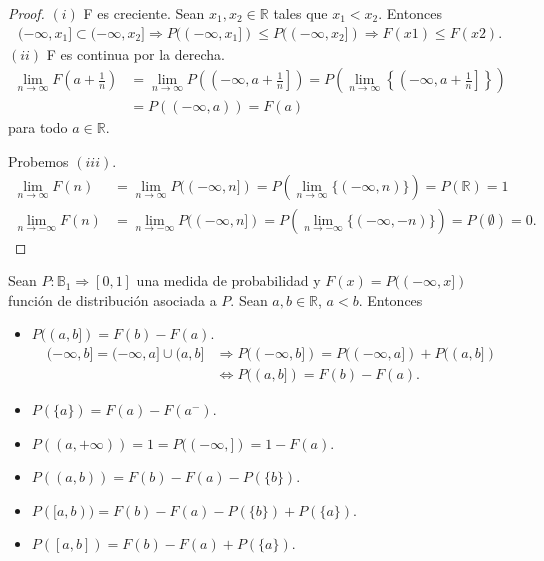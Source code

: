 \begin{proof}
    $(i)$ F es creciente. Sean $x_1, x_2 \in \mathbb{R}$ tales que $x_1 < x_2$. Entonces
    \begin{align*}
        (-\infty, x_1] \subset (-\infty, x_2] \Longrightarrow P((-\infty, x_1]) \leq P((-\infty, x_2]) \Longrightarrow F(x1) \leq F(x2).
    \end{align*}
    $(ii)$ F es continua por la derecha.
    \begin{align*}
        \lim_{n \to \infty}{F\left( a + \frac{1}{n}\right)} & = \lim_{n \to \infty}{P\left(\left( -\infty, a + \frac{1}{n}\right]\right)} = P\left( \lim_{n \to \infty}{\left\{ \left( -\infty, a + \frac{1}{n} \right]\right\}} \right) \\
                                                            & = P((-\infty, a)) = F(a)
    \end{align*}
    para todo $a \in \mathbb{R}$.

    Probemos $(iii)$.
    \begin{align*}
        \lim_{n \to \infty}{F(n)}  & = \lim_{n \to \infty}{P((-\infty, n])} = P\left(\lim_{n \to \infty}{\{(-\infty, n) \}}\right) =P(\mathbb{R}) = 1             \\
        \lim_{n \to -\infty}{F(n)} & = \lim_{n \to -\infty}{P((-\infty, n])} = P\left(\lim_{n \to -\infty}{\{(-\infty, -n) \}}\right) =P(\mathbb{\emptyset}) = 0.
    \end{align*}
\end{proof}

\begin{obs}
    Sean $P: \mathbb{B}_1 \Longrightarrow [0,1]$ una medida de probabilidad y $F(x) = P((-\infty,x])$ función de distribución asociada a $P$. Sean $a, b \in \mathbb{R}$, $a < b$. Entonces
    \begin{itemize}
        \item $P((a,b]) = F(b) - F(a)$.
              \begin{align*}
                  (-\infty,b] = (-\infty,a] \cup (a,b] & \Longrightarrow P((-\infty, b]) = P((-\infty,a]) + P((a,b]) \\
                                                       & \Longleftrightarrow P((a,b]) = F(b) - F(a).
              \end{align*}
        \item $P(\{a\}) = F(a) - F(a^-)$.
        \item $P((a, +\infty)) = 1 = P((-\infty,]) = 1 - F(a)$.
        \item $P((a,b)) = F(b) - F(a) - P(\{b\})$.
        \item $P([a,b)) = F(b) - F(a) - P(\{b\}) + P(\{a\})$.
        \item $P([a,b]) = F(b) - F(a) + P(\{a\})$.
    \end{itemize}
\end{obs}

